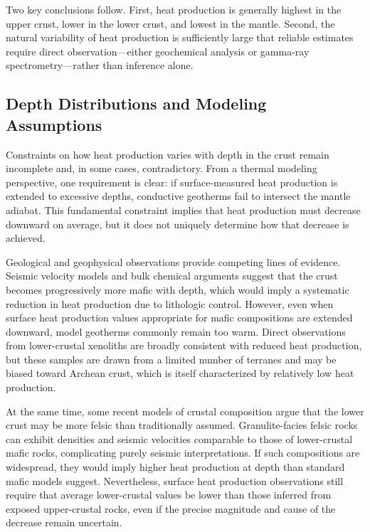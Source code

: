 Two key conclusions follow. First, heat production is generally highest in the upper crust, lower in the lower crust, and lowest in the mantle. Second, the natural variability of heat production is sufficiently large that reliable estimates require direct observation---either geochemical analysis or gamma-ray spectrometry---rather than inference alone.

\subsection{Depth Distributions and Modeling Assumptions}

Constraints on how heat production varies with depth in the crust remain incomplete and, in some cases, contradictory. From a thermal modeling perspective, one requirement is clear: if surface-measured heat production is extended to excessive depths, conductive geotherms fail to intersect the mantle adiabat. This fundamental constraint implies that heat production must decrease downward on average, but it does not uniquely determine how that decrease is achieved.

Geological and geophysical observations provide competing lines of evidence. Seismic velocity models and bulk chemical arguments suggest that the crust becomes progressively more mafic with depth, which would imply a systematic reduction in heat production due to lithologic control. However, even when surface heat production values appropriate for mafic compositions are extended downward, model geotherms commonly remain too warm. Direct observations from lower-crustal xenoliths are broadly consistent with reduced heat production, but these samples are drawn from a limited number of terranes and may be biased toward Archean crust, which is itself characterized by relatively low heat production.

At the same time, some recent models of crustal composition argue that the lower crust may be more felsic than traditionally assumed. Granulite-facies felsic rocks can exhibit densities and seismic velocities comparable to those of lower-crustal mafic rocks, complicating purely seismic interpretations. If such compositions are widespread, they would imply higher heat production at depth than standard mafic models suggest. Nevertheless, surface heat production observations still require that average lower-crustal values be lower than those inferred from exposed upper-crustal rocks, even if the precise magnitude and cause of the decrease remain uncertain.

